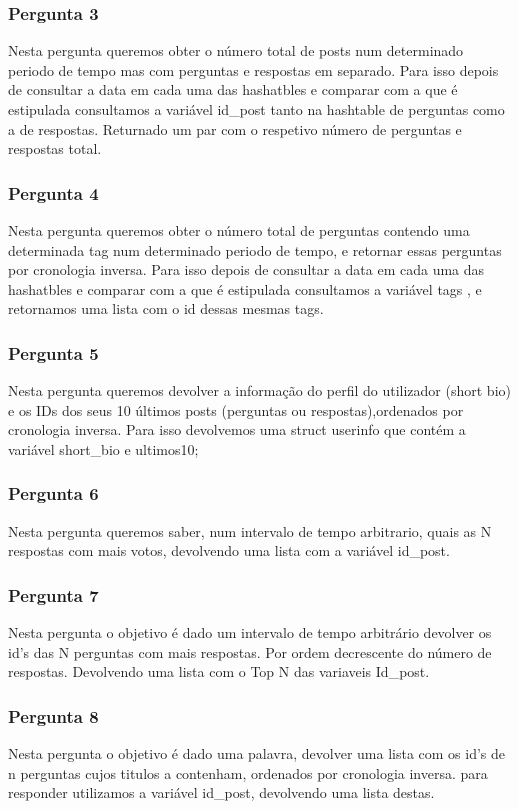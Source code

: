 \documentclass[a4paper]{article}
\begin{document}
		\subsubsection{Pergunta 3}
		Nesta pergunta queremos obter o número total de posts num determinado periodo de tempo mas com perguntas e respostas em separado. Para isso depois de consultar a data em cada uma das hashatbles e comparar com a que é estipulada consultamos a variável id_post tanto na hashtable de perguntas como a de respostas. Returnado um par com o respetivo número de perguntas e respostas total.

		\subsubsection{Pergunta 4}
		Nesta pergunta queremos obter o número total de perguntas contendo uma determinada tag num determinado periodo de tempo, e retornar essas perguntas por cronologia inversa.
		Para isso depois de consultar a data em cada uma das hashatbles e comparar com a que é estipulada consultamos a variável tags , e retornamos uma lista com o id dessas mesmas tags. 
		\subsubsection{Pergunta 5}
		 Nesta pergunta queremos devolver a informação do
		perfil do utilizador (short bio) e os IDs dos seus 10 últimos posts (perguntas ou respostas),ordenados por cronologia inversa. Para isso devolvemos uma struct userinfo que contém a variável short_bio e ultimos10;
		\subsubsection{Pergunta 6}
		Nesta pergunta queremos saber, num intervalo de tempo arbitrario, quais as N respostas com mais votos, devolvendo uma lista com  a variável id_post.
		\subsubsection{Pergunta 7}
		Nesta pergunta o objetivo é dado um intervalo de tempo arbitrário devolver os id's das N perguntas com mais respostas. Por ordem decrescente do número de respostas.
		Devolvendo uma lista com o Top N das variaveis Id_post.
		\subsubsection{Pergunta 8}
		Nesta pergunta o objetivo é dado uma palavra, devolver uma lista com os id's de n perguntas cujos titulos a contenham, ordenados por cronologia inversa. para responder utilizamos a variável id_post, devolvendo uma lista destas.
\end{document}
